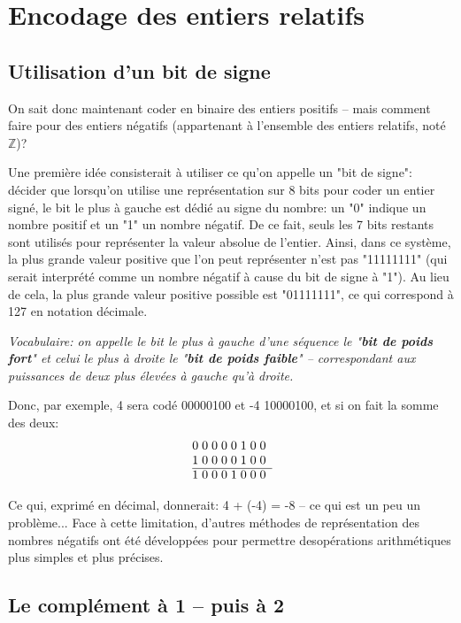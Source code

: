 \documentclass[12pt]{article}
\begin{document}
	\pagebreak
	
	\section{Encodage des entiers relatifs}
	\subsection{Utilisation d'un bit de signe}
	On sait donc maintenant coder en binaire des entiers positifs -- mais comment faire pour des entiers négatifs (appartenant à l'ensemble des entiers relatifs, noté $\mathbb{Z}$)?
	
	Une première idée consisterait à utiliser ce qu'on appelle un "bit de signe": décider que  lorsqu'on utilise une représentation sur 8 bits pour coder un entier signé, le bit le plus à gauche est dédié au signe du nombre: un "0" indique un nombre positif et un "1" un nombre négatif. De ce fait, seuls les 7 bits restants sont utilisés pour représenter la valeur absolue de l’entier. Ainsi, dans ce système, la plus grande valeur positive que l’on peut représenter n’est pas "11111111" (qui serait interprété comme un nombre négatif à cause du bit de signe à "1"). Au lieu de cela, la plus grande valeur positive possible est "01111111", ce qui correspond à 127 en notation décimale.
	
	\textit{Vocabulaire: on appelle le bit le plus à gauche d'une séquence le "\textbf{bit de poids fort}" et celui le plus à droite le "\textbf{bit de poids faible}" -- correspondant aux puissances de deux plus élevées à gauche qu'à droite.}
	
	Donc, par exemple, 4 sera codé 00000100 et -4 10000100, et si on fait la somme des deux:
	 \[
	\begin{array}{@{}r *{8}{@{\;}c}}
		& 0 & 0 & 0 & 0 & 0 & 1 & 0 & 0 \\
		& 1 & 0 & 0 & 0 & 0 & 1 & 0 & 0 \\
		\cline{2-9}
		& 1 & 0 & 0 & 0 & 1 & 0 & 0 & 0 \\
	\end{array}
	\]
	
	Ce qui, exprimé en décimal, donnerait: 4 + (-4) = -8 -- ce qui est un peu un problème... Face à cette limitation, d'autres méthodes de représentation des nombres négatifs ont été développées pour permettre desopérations arithmétiques plus simples et plus précises.
	
	\subsection{Le complément à 1 -- puis à 2}
\end{document}
